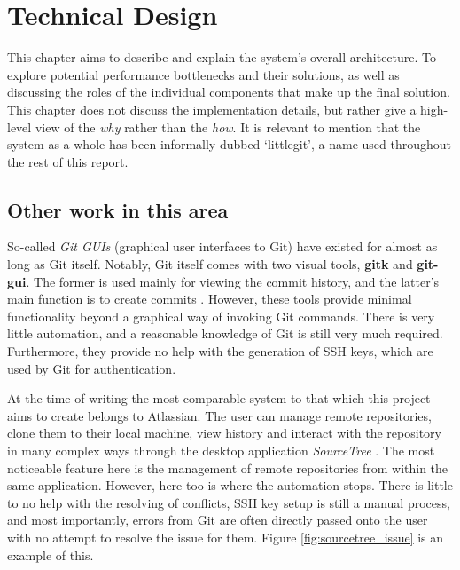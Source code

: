  \chapter{Technical Design}

This chapter aims to describe and explain the system's overall architecture. To explore potential performance bottlenecks and their solutions, as well as discussing the roles of the individual components that make up the final solution. This chapter does not discuss the implementation details, but rather give a high-level view of the \emph{why} rather than the \emph{how}. It is relevant to mention that the system as a whole has been informally dubbed `littlegit', a name used throughout the rest of this report.

\section{Other work in this area}

So-called \emph{Git GUIs} (graphical user interfaces to Git) have existed for almost as long as Git itself. Notably, Git itself comes with two visual tools, \textbf{gitk}\cite{gitk} and \textbf{git-gui}\cite{gitgui}. The former is used mainly for viewing the commit history, and the latter's main function is to create commits \cite{gitguis}. However, these tools provide minimal functionality beyond a graphical way of invoking Git commands. There is very little automation, and a reasonable knowledge of Git is still very much required. Furthermore, they provide no help with the generation of SSH keys, which are used by Git for authentication.

At the time of writing the most comparable system to that which this project aims to create belongs to Atlassian. The user can manage remote repositories, clone them to their local machine, view history and interact with the repository in many complex ways through the desktop application \emph{SourceTree} \cite{sourcetree}. The most noticeable feature here is the management of remote repositories from within the same application. However, here too is where the automation stops. There is little to no help with the resolving of conflicts, SSH key setup is still a manual process, and most importantly, errors from Git are often directly passed onto the user with no attempt to resolve the issue for them. Figure \ref{fig:sourcetree_issue} is an example of this.


